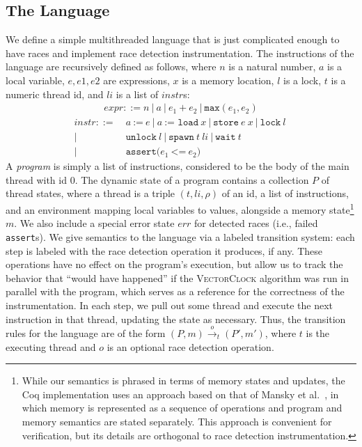 \documentclass[preprint, 10pt]{sigplanconf}
\newcommand{\VCalg}{\textsc{VectorClock}\xspace}
\newcommand{\assign}[2]{#1\ \texttt{:=}\ #2}
\newcommand{\load}[2]{#1\ \texttt{:= load}\ #2}
\newcommand{\store}[2]{\texttt{store}\ #2\ #1}
\newcommand{\lock}[1]{\texttt{lock}\ #1}
\newcommand{\unlock}[1]{\texttt{unlock}\ #1}
\newcommand{\spawn}[2]{\texttt{spawn}\ #1\ #2}
\newcommand{\wait}[1]{\texttt{wait}\ #1}
\newcommand{\assert}[2]{\texttt{assert(}#1\ \texttt{<=}\ #2\texttt{)}}
\newcommand{\cfg}[2]{\ensuremath{(#1, #2)}}
\newcommand{\anarrow}[2]{\ensuremath{\xrightarrow{#2}_{#1}}}
\newcommand{\exec}[5]{\ensuremath{\cfg{#1}{#2} \anarrow{#3}{#4} #5}}
\begin{document}
\subsection{The Language}
We define a simple multithreaded language that is just complicated enough to have races and implement race detection instrumentation. The instructions of the language are recursively defined as follows, where $n$ is a natural number, $a$ is a local variable, $e, e1, e2$ are expressions, $x$ is a memory location, $l$ is a lock, $t$ is a numeric thread id, and $\mathit{li}$ is a list of $\mathit{instr}$s:
\begin{align*}\mathit{expr} ::= n~|~a~|~e_1 + e_2~|~\mathtt{max}(e_1, e_2)\end{align*}
\begin{align*}\mathit{instr} ::=\ &\assign{a}{e}~|~\load{a}{x}~|~\store{x}{e}~|~\lock{l}~\\|~&\unlock{l}~|~\spawn{t}{\mathit{li}}~|~\wait{t}~\\|~&\assert{e_1}{e_2}\end{align*}
A \emph{program} is simply a list of instructions, considered to be the body of the main thread with id $0$. The dynamic state of a program contains a collection $P$ of thread states, where a thread is a triple $(t, \mathit{li}, \rho)$ of an id, a list of instructions, and an environment mapping local variables to values, alongside a memory state\footnote{While our semantics is phrased in terms of memory states and updates, the Coq implementation uses an approach based on that of Mansky et al.~\cite{memspec}, in which memory is represented as a sequence of operations and program and memory semantics are stated separately. This approach is convenient for verification, but its details are orthogonal to race detection instrumentation.} $m$. We also include a special error state $\mathit{err}$ for detected races (i.e., failed \texttt{assert}s). We give semantics to the language via a labeled transition system: each step is labeled with the race detection operation it produces, if any. These operations have no effect on the program's execution, but allow us to track the behavior that ``would have happened'' if the \VCalg algorithm was run in parallel with the program, which serves as a reference for the correctness of the instrumentation. In each step, we pull out some thread and execute the next instruction in that thread, updating the state as necessary. Thus, the transition rules for the language are of the form \exec{P}{m}{t}{o}{(P', m')}, where $t$ is the executing thread and $o$ is an optional race detection operation. 
\end{document}
